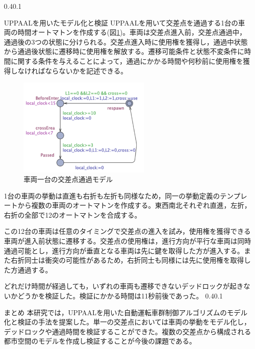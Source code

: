 \documentclass[twocolumn,10pt]{jsarticle}
\makeatletter
\renewcommand{\section}{%
   \@startsection{section}{1}{\z@}%
   {0.4\Cvs}{0.1\Cvs}%
   {\normalfont\large\headfont\raggedright}}
\makeatother
\begin{document}
\section{UPPAALを用いたモデル化と検証}
UPPAALを用いて交差点を通過する1台の車両の時間オートマトンを作成する(図\ref{Simple})。車両は交差点進入前，交差点通過中，通過後の3つの状態に分けられる。交差点進入時に使用権を獲得し，通過中状態から通過後状態に遷移時に使用権を解放する。遷移可能条件と状態不変条件に時間に関する条件を与えることによって，通過にかかる時間や何秒前に使用権を獲得しなければならないかを記述できる。
\begin{figure}[htbp]
\centering
\includegraphics[width=65mm]{Simple.png}
\caption{車両一台の交差点通過モデル}
\label{Simple}
\end{figure}

1台の車両の挙動は直進も右折も左折も同様なため，同一の挙動定義のテンプレートから複数の車両のオートマトンを作成する。東西南北それぞれ直進，左折，右折の全部で12のオートマトンを合成する。

この12台の車両は任意のタイミングで交差点の進入を試み，使用権を獲得できる車両が進入前状態に遷移する。交差点の使用権は，進行方向が平行な車両は同時通過可能とし，進行方向が垂直となる車両は先に鍵を取得した方が進入する。また右折同士は衝突の可能性があるため，右折同士も同様には先に使用権を取得した方通過する。

どれだけ時間が経過しても，いずれの車両も遷移できないデッドロックが起きないかどうかを検証した。検証にかかる時間は11秒前後であった。
\section{まとめ}
本研究では，UPPAALを用いた自動運転車群制御アルゴリズムのモデル化と検証の手法を提案した。単一の交差点においては車両の挙動をモデル化し，デッドロックや通過時間を検証することができた。複数の交差点から構成される都市空間のモデルを作成し検証することが今後の課題である。
\begin{thebibliography}{1}
\end{thebibliography}
%
\end{document}
